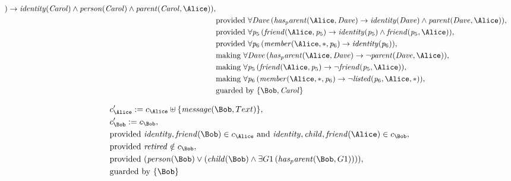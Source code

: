 \begin{align*}
)
\rightarrow
\mathit{
identity
}
(
\mathit{Carol}
)
\land
\mathit{
person
}
(
\mathit{Carol}
)
\land
\mathit{
parent
}
(
\mathit{Carol}
,
\Alice
)
)
,\\
&
\text{provided } 
\forall 
\mathit{Dave}
\,(
\mathit{
has_parent
}
(
\Alice
,
\mathit{Dave}
)
\rightarrow
\mathit{
identity
}
(
\mathit{Dave}
)
\land
\mathit{
parent
}
(
\mathit{Dave}
,
\Alice
)
)
,\\
&
\text{provided } 
\forall 
\mathit{p}_{
5
}
\,(
\mathit{
friend
}
(
\Alice
,
\mathit{p}_{
5
}
)
\rightarrow
\mathit{
identity
}
(
\mathit{p}_{
5
}
)
\land
\mathit{
friend
}
(
\mathit{p}_{
5
}
,
\Alice
)
)
,\\
&
\text{provided } 
\forall 
\mathit{p}_{
6
}
\,(
\mathit{
member
}
(
\Alice
,
\ast
,
\mathit{p}_{
6
}
)
\rightarrow
\mathit{
identity
}
(
\mathit{p}_{
6
}
)
)
,\\
&
\text{making } 
\forall 
\mathit{Dave}
\,(
\mathit{
has_parent
}
(
\Alice
,
\mathit{Dave}
)
\rightarrow
\neg 
\mathit{
parent
}
(
\mathit{Dave}
,
\Alice
)
)
,\\
&
\text{making } 
\forall 
\mathit{p}_{
5
}
\,(
\mathit{
friend
}
(
\Alice
,
\mathit{p}_{
5
}
)
\rightarrow
\neg 
\mathit{
friend
}
(
\mathit{p}_{
5
}
,
\Alice
)
)
,\\
&
\text{making } 
\forall 
\mathit{p}_{
6
}
\,(
\mathit{
member
}
(
\Alice
,
\ast
,
\mathit{p}_{
6
}
)
\rightarrow
\neg 
\mathit{
listed
}
(
\mathit{p}_{
6
}
,
\Alice
,
\ast
)
)
,\\
&
\text{guarded by } \{
\Bob
,
\mathit{Carol}
\}
\end{align*}

\begin{align*}
&
c'_
{
\Alice
}
 := 
c_
{
\Alice
}
 \uplus 
\{
\mathit{
message
}
(
\Bob
,
Text
)
\}
,\\
&
c'_
{
\Bob
}
 := 
c_
{
\Bob
}
,\\
&
\text{provided } 
\mathit{
identity
}
,
\mathit{
friend
}
(
\Bob
)
 \in c_
{
\Alice
}
 \text{ and } 
\mathit{
identity
}
,
\mathit{
child
}
,
\mathit{
friend
}
(
\Alice
)
 \in c_
{
\Bob
}
,\\
&
\text{provided } 
\mathit{
retired
}
 \notin c_
{
\Bob
}
,\\
&
\text{provided } 
(
\mathit{
person
}
(
\Bob
)
\lor
(
\mathit{
child
}
(
\Bob
)
\land
\exists 
G1
\,(
\mathit{
has_parent
}
(
\Bob
,
G1
)
)
)
)
,\\
&
\text{guarded by } \{
\Bob
\}
\end{align*}

